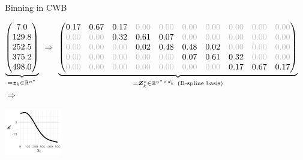 \documentclass[t,10pt]{beamer}
\begin{document}
\begin{frame}{Binning in CWB}
  \hspace{-0.2cm}
  \begin{minipage}{0.85\textwidth}
    {\tiny $\underbrace{\begin{pmatrix} 7.0 \\ 129.8 \\ 252.5 \\ 375.2 \\ 498.0 \end{pmatrix}}_{= \bm{z}_{k}\in\mathbb{R}^{n^\ast}}$}
  {\normalsize $\Rightarrow$}
  {\tiny $\underbrace{
    \begin{pmatrix}
      \color{black}0.17 & \color{black}0.67 & \color{black}0.17 & \color{lightgray}0.00 & \color{lightgray}0.00 & \color{lightgray}0.00 &
        \color{lightgray}0.00 & \color{lightgray}0.00 & \color{lightgray}0.00 & \color{lightgray}0.00\\
      \color{lightgray}0.00 & \color{lightgray}0.00 & \color{black}0.32 & \color{black}0.61 & \color{black}0.07 & \color{lightgray}0.00 &
        \color{lightgray}0.00 & \color{lightgray}0.00 & \color{lightgray}0.00 & \color{lightgray}0.00\\
      \color{lightgray}0.00 & \color{lightgray}0.00 & \color{lightgray}0.00 & \color{black}0.02 & \color{black}0.48 & \color{black}0.48 &
        \color{black}0.02 & \color{lightgray}0.00 & \color{lightgray}0.00 & \color{lightgray}0.00\\
      \color{lightgray}0.00 & \color{lightgray}0.00 & \color{lightgray}0.00 & \color{lightgray}0.00 & \color{lightgray}0.00 & \color{black}0.07 &
        \color{black}0.61 & \color{black}0.32 & \color{lightgray}0.00 & \color{lightgray}0.00\\
      \color{lightgray}0.00 & \color{lightgray}0.00 & \color{lightgray}0.00 & \color{lightgray}0.00 & \color{lightgray}0.00 & \color{lightgray}0.00 &
        \color{lightgray}0.00 & \color{black}0.17 & \color{black}0.67 & \color{black}0.17
    \end{pmatrix}}_{=\bm{Z}^\ast_{k}\in\R^{n^\ast\times d_k}\ \text{(B-spline basis)}}$}%
  {\normalsize $\Rightarrow$}
  \end{minipage}\hspace{-0.38cm}
  \begin{minipage}{0.13\textwidth}
    \vspace{-0.3cm}
    \parbox{0.5\linewidth}{\includegraphics[width=2.5cm]{figures/binning/fig-fe.png}}
  \end{minipage}
\end{frame}
\end{document}
